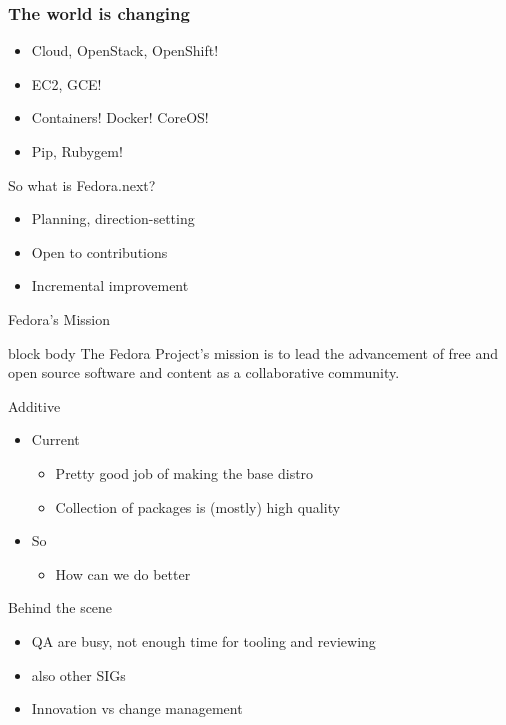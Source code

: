 \documentclass{beamer}
\begin{document}
\begin{frame}
  \frametitle{The world is changing}
  \begin{itemize}
      \item Cloud, OpenStack, OpenShift!
      \item EC2, GCE!
      \item Containers! Docker! CoreOS!
      \item Pip, Rubygem!
  \end{itemize}
\end{frame}

\begin{frame}{So what is Fedora.next?}
  \begin{itemize}
    \item Planning, direction-setting
    \item Open to contributions
    \item Incremental improvement
  \end{itemize}
\end{frame}

\begin{frame}{Fedora's Mission}
  \begin{beamercolorbox}[center,ht=4ex,dp=0.5ex,rounded=true]{block body}
    {\centering The Fedora Project's mission is to lead the advancement of free and
  open source software and content as a collaborative community.}
  \end{beamercolorbox}
\end{frame}

\begin{frame}{Additive}
  \begin{itemize}
    \item Current
    \begin{itemize}
      \item Pretty good job of making the base distro
      \item Collection of packages is (mostly) high quality
    \end{itemize}
    \item So
    \begin{itemize}
      \item How can we do better
    \end{itemize}
  \end{itemize}
\end{frame}

\begin{frame}{Behind the scene}
  \begin{itemize}
    \item QA are busy, not enough time for tooling and reviewing
    \item also other SIGs
    \item Innovation vs change management
  \end{itemize}
\end{frame}
\end{document}
